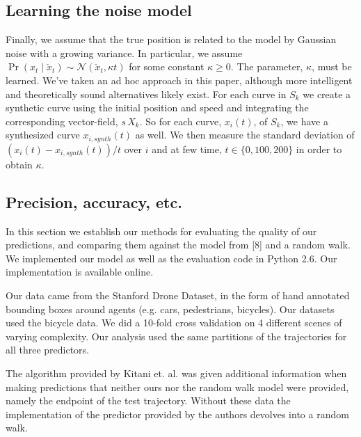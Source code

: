 \documentclass[conference]{IEEEtran}
\begin{document}
  \subsection{Learning the noise model}
  Finally, we assume that the true position is related to the model by Gaussian noise with a growing variance.
  In particular, we assume $\Pr( x_t \mid \check{x}_t) \sim \mathcal{N}( \check{x}_t , \kappa t)$ for some constant $\kappa \geq 0$.
  The parameter, $\kappa$, must be learned.
  We've taken an ad hoc approach in this paper, although more intelligent and theoretically sound alternatives likely exist.
  For each curve in $S_k$ we create a synthetic curve using the initial position and speed and integrating the corresponding vector-field, $s\, X_k$.
  So for each curve, $x_i(t)$, of $S_k$, we have a synthesized curve $x_{i,synth}(t)$ as well.
  We then measure the standard deviation of $(x_i(t) - x_{i,synth}(t)) / t$ over $i$ and at few time, $t \in \{ 0, 100, 200 \}$ in order to obtain $\kappa$.
  
 \subsection{ Precision, accuracy, etc.}
In this section we establish our methods for evaluating the quality of our predictions, and comparing them against the model from [8] and a random walk.
We implemented our model as well as the evaluation code in Python 2.6. Our implementation is available online.


Our data came from the Stanford Drone Dataset, in the form of hand annotated bounding boxes around agents (e.g. cars, pedestrians, bicycles). Our datasets used the bicycle data. We did a 10-fold cross validation on 4 different scenes of varying complexity. Our analysis used the same partitions of the trajectories for all three predictors. %


The algorithm provided by Kitani et. al. was given additional information when making predictions that neither ours nor the random walk model were provided, namely the endpoint of the test trajectory. Without these data the implementation of the predictor provided by the authors devolves into a random walk.
\end{document}
